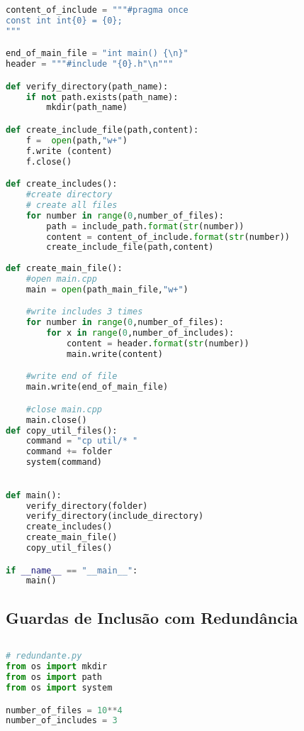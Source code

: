 \begin{apendicesenv}
\begin{lstlisting}[language=Python, caption={
                     Script Pragma Once},
             label=script_pragma_once_include]
content_of_include = """#pragma once
const int int{0} = {0};
"""

end_of_main_file = "int main() {\n}"
header = """#include "{0}.h"\n"""

def verify_directory(path_name):
    if not path.exists(path_name):
        mkdir(path_name)

def create_include_file(path,content):
    f =  open(path,"w+")
    f.write (content)
    f.close()

def create_includes():
    #create directory
    # create all files
    for number in range(0,number_of_files):
        path = include_path.format(str(number))
        content = content_of_include.format(str(number))
        create_include_file(path,content)
    
def create_main_file():
    #open main.cpp
    main = open(path_main_file,"w+")

    #write includes 3 times
    for number in range(0,number_of_files):
        for x in range(0,number_of_includes):
            content = header.format(str(number))
            main.write(content)

    #write end of file
    main.write(end_of_main_file)

    #close main.cpp
    main.close()
def copy_util_files():                                                           
    command = "cp util/* "                                                       
    command += folder                                                            
    system(command)                                                              
                      

def main():
    verify_directory(folder)
    verify_directory(include_directory)
    create_includes()
    create_main_file()
    copy_util_files()

if __name__ == "__main__":
    main()
\end{lstlisting}

\subsection{Guardas de Inclusão com Redundância}
\begin{lstlisting}[language=Python,caption={
     Script Redundância de Guardas de Inclusão},
                 label=script_redundante_include]
                 
# redundante.py
from os import mkdir
from os import path
from os import system

number_of_files = 10**4
number_of_includes = 3


\end{lstlisting}
\end{apendicesenv}
